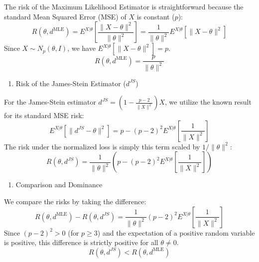 \documentclass[
  letterpaper,
  DIV=11,
  numbers=noendperiod]{scrreprt}
\providecommand{\tightlist}{%
  \setlength{\itemsep}{0pt}\setlength{\parskip}{0pt}}
\renewcommand{\[}{\begin{equation}}
\renewcommand{\]}{\end{equation}}
\theoremstyle{definition}
\theoremstyle{plain}
\theoremstyle{plain}
\theoremstyle{plain}
\theoremstyle{definition}
\theoremstyle{plain}
\theoremstyle{remark}
\begin{document}
The risk of the Maximum Likelihood Estimator is straightforward because
the standard Mean Squared Error (MSE) of \(X\) is constant (\(p\)): \[
R(\theta, d^{\text{MLE}}) = E^{X|\theta} \left[ \frac{\lVert X - \theta \rVert^2}{\lVert \theta \rVert^2} \right] = \frac{1}{\lVert \theta \rVert^2} E^{X|\theta} \left[ \lVert X - \theta \rVert^2 \right]
\] Since \(X \sim N_p(\theta, I)\), we have
\(E^{X|\theta}[\lVert X - \theta \rVert^2] = p\). \[
R(\theta, d^{\text{MLE}}) = \frac{p}{\lVert \theta \rVert^2}
\]

\begin{enumerate}
\def\labelenumi{\arabic{enumi}.}
\setcounter{enumi}{1}
\tightlist
\item
  Risk of the James-Stein Estimator (\(d^{JS}\))
\end{enumerate}

For the James-Stein estimator
\(d^{JS} = \left( 1 - \frac{p-2}{\lVert X \rVert^2} \right)X\), we
utilize the known result for its standard MSE risk: \[
E^{X|\theta} [\lVert d^{JS} - \theta \rVert^2] = p - (p-2)^2 E^{X|\theta} \left[ \frac{1}{\lVert X \rVert^2} \right]
\] The risk under the normalized loss is simply this term scaled by
\(1/\lVert \theta \rVert^2\): \[
R(\theta, d^{JS}) = \frac{1}{\lVert \theta \rVert^2} \left( p - (p-2)^2 E^{X|\theta} \left[ \frac{1}{\lVert X \rVert^2} \right] \right)
\]

\begin{enumerate}
\def\labelenumi{\arabic{enumi}.}
\setcounter{enumi}{2}
\tightlist
\item
  Comparison and Dominance
\end{enumerate}

We compare the risks by taking the difference: \[
R(\theta, d^{\text{MLE}}) - R(\theta, d^{JS}) = \frac{1}{\lVert \theta \rVert^2} (p-2)^2 E^{X|\theta} \left[ \frac{1}{\lVert X \rVert^2} \right]
\] Since \((p-2)^2 > 0\) (for \(p \ge 3\)) and the expectation of a
positive random variable is positive, this difference is strictly
positive for all \(\theta \neq 0\). \[
R(\theta, d^{JS}) < R(\theta, d^{\text{MLE}})
\]
\end{document}
